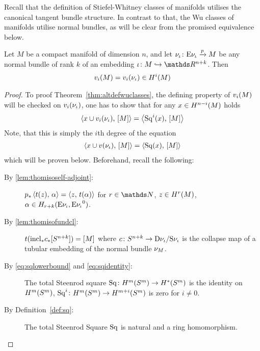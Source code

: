 Recall that the definition of Stiefel-Whitney classes of manifolds
utilises the canonical tangent bundle structure.
In contrast to that, the Wu classes of manifolds utilise normal
bundles, as will be clear from the promised equivalence below.
\begin{Thm}\label{thm:altdefwuclasses}
  Let $M$ be a compact manifold of dimension $n$, and let
  $\nu_{{\iota}}\colon \mathrm{E}\nu_{{\iota}} \xrightarrow{p} M$ be
  any normal bundle of rank $k$ of an embedding
  $\emb\colon M\immto\R^{n+k}$. Then
  \begin{gather*}
    {v_{i}}(M) = {v_{i}}(\nu_{{\iota}})\in H^i(M)
  \end{gather*}
  \begin{proof}
    To proof Theorem~\ref{thm:altdefwuclasses}, the defining property of
    ${v_{i}}(M)$ will be checked on ${v_{i}}(\nu_{{\iota}})$, \idest one has to show
    that for any $x\in H^{n-i}(M)$ holds
    \begin{gather*}
      \left\langle x\cup {v_{i}}(\nu_{{\iota}}),\, [M] \right\rangle
      = \left\langle \mathrm{Sq}^{i}(x),\, [M] \right\rangle
    \end{gather*}
    Note, that this is simply the $i$th degree of the equation
    \begin{gather}\label{eq:proofaltdefwuclasses:claim}
      \left\langle x\cup {v}(\nu_{{\iota}}),\, [M] \right\rangle
      = \left\langle \mathrm{Sq}(x),\, [M] \right\rangle
    \end{gather}
    which will be proven below.
    Beforehand, recall the following:
    \begin{description}
    \item[By \ref{lem:thomisoself-adjoint}:]
      ${p}_*\left\langle t(z),\, \alpha \right\rangle = \left\langle z,\, t(\alpha) \right\rangle$
      for $r\in\Nat$, $z\in H^r(M)$,
      $\alpha\in H_{r+k}(\mathrm{E}\nu_{{\iota}}, {\mathrm{E}\nu_{{\iota}}}^0)$.
    \item[By \ref{lem:thomisofundcl}:]
      $t({\mathrm{incl}}_*{c}_*[S^{n+k}]) = [M]$
      where $c\colon
      S^{n+k}\to\mathrm{D}\nu_{{\iota}}/\mathrm{S}\nu_{{\iota}}$ is
      the collapse map of a tubular embedding of the normal bundle
      $\nu_{M}$.
    \item[By \eqref{eq:sqlowerbound} and \eqref{eq:sqidentity}:]
      The total Steenrod square
      $\mathrm{Sq}\colon H^m(S^{m})
      \to H^*(S^{m})$
      is the identity on $H^m(S^{m})$, \idest
      $\mathrm{Sq}^{i}\colon H^m(S^{m})\to H^{m+i}(S^{m})$ is zero for
      $i\neq0$.
    \item[By Definition~\ref{def:sq}:] The total Steenrod Square
      $\mathrm{Sq}$ is natural and a ring homomorphism.

\end{description}
\end{proof}
\end{Thm}
